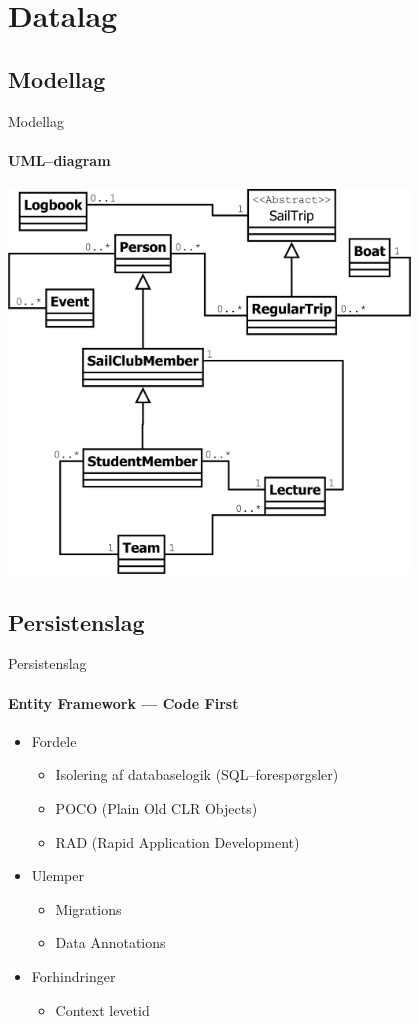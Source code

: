 \section{Datalag}


\subsection{Modellag}

\begin{frame}{Modellag}
  \framesubtitle{UML--diagram}
  \begin{center}
    \includegraphics[width=0.8\textwidth,height=0.8\textheight,keepaspectratio]{images/UML.png}
  \end{center}
\end{frame}


\subsection{Persistenslag}

\begin{frame}{Persistenslag}
  \framesubtitle{Entity Framework --- Code First}
  \begin{itemize}
    \item<1-> Fordele
    \begin{itemize}
      \item<1-> Isolering af databaselogik (SQL--forespørgsler)
      \item<1-> POCO (Plain Old CLR Objects)
      \item<1-> RAD (Rapid Application Development)
    \end{itemize}
    \item<2-> Ulemper
    \begin{itemize}
      \item<2-> Migrations
      \item<2-> Data Annotations
    \end{itemize}
    \item<3-> Forhindringer
    \begin{itemize}
      \item<3-> Context levetid
    \end{itemize}
  \end{itemize}
\end{frame}

